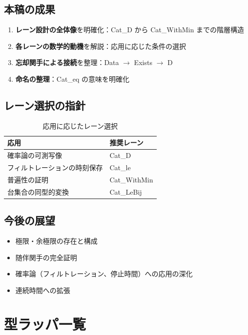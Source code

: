 \documentclass{ltjsarticle}
\theoremstyle{definition}
\begin{document}
\subsection{本稿の成果}

\begin{enumerate}
  \item \textbf{レーン設計の全体像}を明確化：Cat\_D から Cat\_WithMin までの階層構造
  \item \textbf{各レーンの数学的動機}を解説：応用に応じた条件の選択
  \item \textbf{忘却関手による接続}を整理：Data $\to$ Exists $\to$ D
  \item \textbf{命名の整理}：Cat\_eq の意味を明確化
\end{enumerate}

\subsection{レーン選択の指針}

\begin{table}[htbp]
\centering
\caption{応用に応じたレーン選択}
\begin{tabular}{@{}ll@{}}
\toprule
\textbf{応用} & \textbf{推奨レーン} \\
\midrule
確率論の可測写像 & Cat\_D \\
フィルトレーションの時刻保存 & Cat\_le \\
普遍性の証明 & Cat\_WithMin \\
台集合の同型的変換 & Cat\_LeBij \\
\bottomrule
\end{tabular}
\end{table}

\subsection{今後の展望}

\begin{itemize}
  \item 極限・余極限の存在と構成
  \item 随伴関手の完全証明
  \item 確率論（フィルトレーション、停止時間）への応用の深化
  \item 連続時間への拡張
\end{itemize}

\appendix
\section{型ラッパ一覧}
\end{document}
